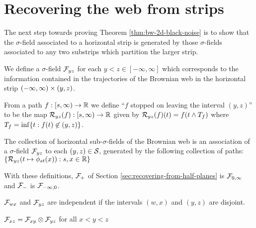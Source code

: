 {
\section{Recovering the web from strips}
\label{sec:recovering-from-strips}

The next step towards proving Theorem \ref{thm:bw-2d-black-noise} is
to show that the $\sigma$-field associated to a horizontal strip is
generated by those $\sigma$-fields associated to any two substrips
which partition the larger strip.

We define a $\sigma$-field $\mathcal{F}_{y z}$ for each $y < z \in
[-\infty, \infty]$ which corresponds to the information contained in
the trajectories of the Brownian web in the horizontal strip
$(-\infty, \infty) \times (y,z)$.

\newcommand{\brownianwebnoise}{collection of horizontal
  sub-$\sigma$-fields of the Brownian web}

\begin{definition}
  \newcommand{\T}{\stripleavetime{f}}
  \label{def:restrict}
  From a path $f : [s, \infty) \to \mathbb{R}$ we define ``$f$ stopped on
    leaving the interval $(y,z)$'' to be the map $\mathcal{R}_{{y}{z}}(f) : [s,
      \infty) \to \mathbb{R}$ given by $\restrict{y}{z}{f}(t) = f(t \minsym \T)$
      where $\T = \inf\{ t : f(t) \not\in (y,z) \}$.

  \label{def:horizontal-factorization}
  The \brownianwebnoise{} is an
  association of a $\sigma$-field $\mathcal{F}_{y z}$ to each $(y, z)
  \in \mathcal{S}$, generated by the following collection of paths:
  $\{ \mathcal{R}_{{y}{z}}(t \mapsto \phi_{{s}{t}}(x)) : s, x \in \mathbb{R} \}$
\end{definition}


With these definitions, $\mathcal{F}_{+}$ of Section \ref{sec:recovering-from-half-planes} is
$\mathcal{F}_{0,\infty}$ and $\mathcal{F}_{-}$ is
$\mathcal{F}_{-\infty,0}$.

\begin{observation}
  $\mathcal{F}_{w x}$ and $\mathcal{F}_{y z}$ are independent if the
  intervals $(w,x)$ and $(y,z)$ are disjoint.
\end{observation}

\renewcommand{\top}{b}
\newcommand{\bottom}{a}

\begin{theorem}\label{thm:recoveringfromstrips}
  $\mathcal{F}_{x z} = \mathcal{F}_{x y} \otimes \mathcal{F}_{y z}$ for all $x < y < z$
\end{theorem}

}

